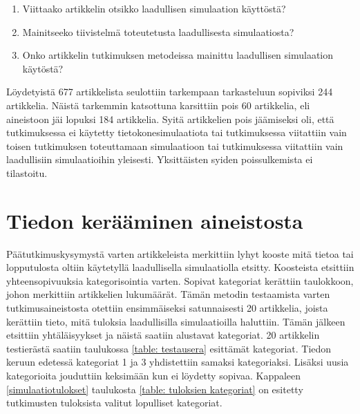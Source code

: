\documentclass[utf8]{gradu3}
\begin{document}
\begin{enumerate}
    \item Viittaako artikkelin otsikko laadullisen simulaation käyttöstä?
    \item Mainitseeko tiivistelmä toteutetusta laadullisesta simulaatiosta?
    \item Onko artikkelin tutkimuksen metodeissa mainittu laadullisen simulaation käytöstä?
\end{enumerate}

Löydetyistä 677 artikkelista seulottiin tarkempaan tarkasteluun sopiviksi 244 artikkelia. 
Näistä tarkemmin katsottuna karsittiin pois 60 artikkelia, 
eli aineistoon jäi lopuksi 184 artikkelia. 
Syitä artikkelien pois jäämiseksi oli, 
että tutkimuksessa ei käytetty tietokonesimulaatiota tai 
tutkimuksessa viitattiin vain toisen tutkimuksen toteuttamaan simulaatioon tai
tutkimuksessa viitattiin vain laadullisiin simulaatioihin yleisesti.
Yksittäisten syiden poissulkemista ei tilastoitu.

\section{Tiedon kerääminen aineistosta} \label{tiedon keruu}
Päätutkimuskysymystä varten artikkeleista merkittiin lyhyt kooste mitä tietoa tai
lopputulosta oltiin käytetyllä laadullisella simulaatiolla etsitty. 
Koosteista etsittiin yhteensopivuuksia kategorisointia varten. 
Sopivat kategoriat kerättiin taulokkoon, johon merkittiin artikkelien lukumäärät.
Tämän metodin testaamista varten tutkimusaineistosta otettiin ensimmäiseksi
satunnaisesti 20 artikkelia, joista kerättiin tieto, mitä tuloksia laadullisilla
simulaatioilla haluttiin. Tämän jälkeen etsittiin yhtäläisyykset ja näistä saatiin
alustavat kategoriat. 20 artikkelin testierästä saatiin taulukossa 
\ref{table: testausera} esittämät kategoriat. Tiedon keruun edetessä kategoriat 1
ja 3 yhdistettiin samaksi kategoriaksi. Lisäksi uusia kategorioita jouduttiin
keksimään kun ei löydetty sopivaa. Kappaleen \ref{simulaatiotulokset} taulukosta
\ref{table: tuloksien kategoriat} on esitetty tutkimusten tuloksista valitut
lopulliset kategoriat.
\end{document}
